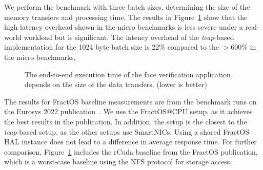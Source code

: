 We perform the benchmark with three batch sizes, determining the size of the memory transfers and processing time.
The results in Figure~\ref{fig:facever-scaling} show that the high latency overhead shown in the micro benchmarks is less severe under a real-world workload but is significant. The latency overhead of the \emph{tcap}-based implementation for the 1024 byte batch size is 22\% compared to the $>600\%$ in the micro benchmarks.
\begin{figure}[H]
  \centering
  
  \caption{\label{fig:facever-scaling} The end-to-end execution time of the face verification application depends on the size of the data transfers. (lower is better)}
\end{figure}

\begin{table}[H]
  \centering
  \vspace{1em}
\caption{\label{tab:face-results} Breakdown of the Faceverification Response Time.}
\end{table}
The results for FractOS baseline measurements are from the benchmark runs on the Eurosys 2022 publication~\cite{vilanovaSlashingDisaggregationTax2022}\@. We use the FractOS@CPU setup, as it achieves the best results in the publication. In addition, the setup is the closest to the \emph{tcap}-based setup, as the other setups use SmartNICs. Using a shared FractOS \ac{HAL} instance does not lead to a difference in average response time. For further comparison, Figure~\ref{fig:facever-scaling} includes the rCuda baseline from the FractOS publication, which is a worst-case baseline using the \ac{NFS} protocol for storage access.
